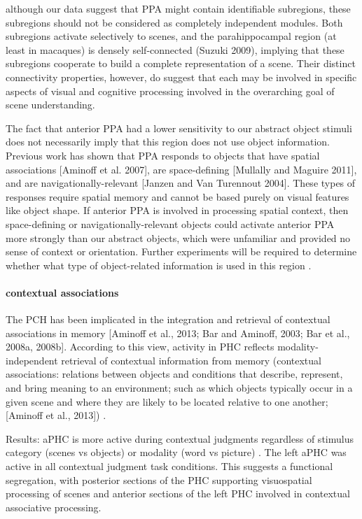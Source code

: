 \documentclass[english]{article}
\begin{document}
%
although our data suggest that PPA might contain identifiable subregions, these
subregions should not be considered as completely independent modules. Both
subregions activate selectively to scenes, and the parahippocampal region (at
least in macaques) is densely self-connected (Suzuki 2009), implying that these
subregions cooperate to build a complete representation of a scene.
%
Their distinct connectivity properties, however, do suggest that each may be
involved in specific aspects of visual and cognitive processing involved in the
overarching goal of scene understanding.

%
The fact that anterior PPA had a lower sensitivity to our abstract object
stimuli does not necessarily imply that this region does not use object
information\citep{baldassano2013differential}.
%
Previous work has shown that PPA responds to objects that have spatial
associations [Aminoff et al. 2007], are space-defining [Mullally and Maguire
2011], and are navigationally-relevant [Janzen and Van Turennout 2004].
%
These types of responses require spatial memory and cannot be based purely on
visual features like object shape. If anterior PPA is involved in processing
spatial context, then space-defining or navigationally-relevant objects could
activate anterior PPA more strongly than our abstract objects, which were
unfamiliar and provided no sense of context or orientation.
%
Further experiments will be required to determine whether what type of
object-related information is used in this region
\citep{baldassano2013differential}.


\paragraph{contextual associations}

%
The PCH has been implicated in the integration and retrieval of contextual
associations in memory [Aminoff et al., 2013; Bar and Aminoff, 2003; Bar et al.,
2008a, 2008b].
%
According to this view, activity in PHC reflects modality-independent retrieval
of contextual information from memory (contextual associations: relations
between objects and conditions that describe, represent, and bring meaning to an
environment; such as which objects typically occur in a given scene and where
they are likely to be located relative to one another; [Aminoff et al., 2013])
\citep{baumann2016functional}.

Results: aPHC is more active during contextual judgments regardless of stimulus
category (scenes vs objects) or modality (word vs picture)
\citep{baumann2016functional}.
%
The left aPHC was active in all contextual judgment task conditions. This
suggests a functional segregation, with posterior sections of the PHC supporting
visuospatial processing of scenes and anterior sections of the left PHC involved
in contextual associative processing\citep{baumann2016functional}.
\end{document}
